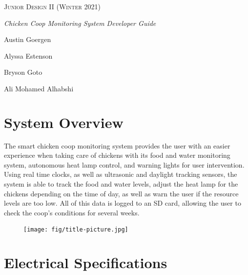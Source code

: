 \documentclass{article}
\begin{document}
\begin{centering}

{\scshape\Large {Junior Design II (Winter 2021)} \par}
\vspace{2cm}

{\huge\textit{Chicken Coop Monitoring System Developer Guide} \par}
\vspace{.5cm}

{\large{Austin Goergen}\par}
{\large{Alyssa Estenson}\par}
{\large{Bryson Goto}\par}
{\large{Ali Mohamed Alhabshi}\par}
\vspace{3cm}

\vspace{.3cm}


\end{centering}

\pagebreak

\section{System Overview}
The smart chicken coop monitoring system provides the user with an easier experience when taking care of chickens with its food and water monitoring system, autonomous heat lamp control, and warning lights for user intervention. Using real time clocks, as well as ultrasonic and daylight tracking sensors, the system is able to track the food and water levels, adjust the heat lamp for the chickens depending on the time of day, as well as warn the user if the resource levels are too low. All of this data is logged to an SD card, allowing the user to check the coop's conditions for several weeks.

\vspace{2.54cm}

\begin{figure}[H]
    \centering
    \texttt{[image: fig/title-picture.jpg]}
\end{figure}

\section{Electrical Specifications}
\end{document}
